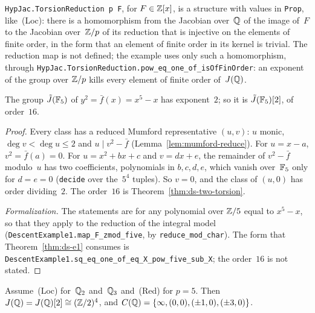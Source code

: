 \begin{remark}[Formalization]
\texttt{HypJac.TorsionReduction p F}, for $F \in \mathbb{Z}[x]$, is a structure with values in
\texttt{Prop}, like~(Loc): there is a homomorphism from the Jacobian over~$\mathbb{Q}$ of the image
of~$F$ to the Jacobian over~$\mathbb{Z}/p$ of its reduction that is injective on the elements of finite
order, in the form that an element of finite order in its kernel is trivial. The reduction map
is not defined; the example uses only such a homomorphism, through
\texttt{HypJac.TorsionReduction.pow\_eq\_one\_of\_isOfFinOrder}: an exponent of the group over
$\mathbb{Z}/p$ kills every element of finite order of~$J(\mathbb{Q})$.
\end{remark}

\begin{lemma}[$\tilde J(\FF_5)$]
\label{lem:ds-e1-five}
\leanok
{}
The group $\tilde J(\FF_5)$ of $y^2 = \bar f(x) = x^5 - x$ has exponent~$2$; so it is
$\tilde J(\mathbb{F}_5)[2]$, of order~$16$.
\end{lemma}

\begin{proof}
\leanok
{}
Every class has a reduced Mumford representative $(u, v)$: $u$ monic, $\deg v < \deg u \le 2$ and
$u \mid v^2 - \bar f$ (Lemma~\ref{lem:mumford-reduce}). For $u = x - a$, $v^2 = \bar f(a) = 0$.
For $u = x^2 + bx + c$ and $v = dx + e$, the remainder of $v^2 - \bar f$ modulo~$u$ has two
coefficients, polynomials in $b, c, d, e$, which vanish over~$\mathbb{F}_5$ only for $d = e = 0$
(\texttt{decide} over the~$5^4$ tuples). So $v = 0$, and the class of $(u, 0)$ has order
dividing~$2$. The order~$16$ is Theorem~\ref{thm:ds-two-torsion}.

\emph{Formalization.} The statements are for any polynomial over $\mathbb{Z}/5$ equal to $x^5 - x$, so
that they apply to the reduction of the integral model (\texttt{DescentExample1.map\_F\_zmod\_five},
by \texttt{reduce\_mod\_char}). The form that Theorem~\ref{thm:ds-e1} consumes is
\texttt{DescentExample1.sq\_eq\_one\_of\_eq\_X\_pow\_five\_sub\_X}; the order~$16$ is not stated.
\end{proof}

\begin{theorem}[E1]
\label{thm:ds-e1}
\leanok
{}
Assume~(Loc) for~$\mathbb{Q}_2$ and~$\mathbb{Q}_3$ and~(Red) for $p = 5$. Then
$J(\mathbb{Q}) = J(\mathbb{Q})[2] \cong (\mathbb{Z}/2)^4$, and $C(\mathbb{Q}) = \{\infty, (0, 0), (\pm 1, 0), (\pm 3, 0)\}$.
\end{theorem}

